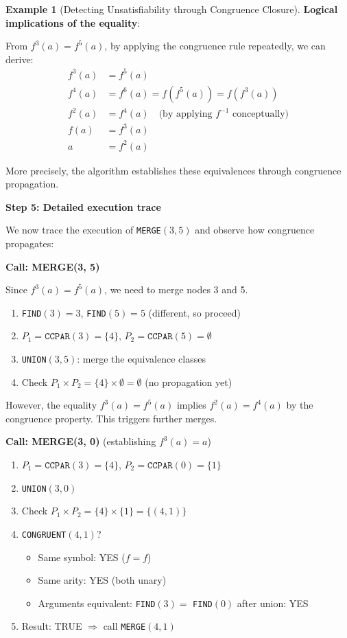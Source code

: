 \documentclass[11pt,a4paper]{article}
\theoremstyle{definition}
\newtheorem{example}{Example}[section]
\theoremstyle{plain}
\theoremstyle{remark}
\begin{document}
\begin{example}[Detecting Unsatisfiability through Congruence Closure]
\textbf{Logical implications of the equality}:

From $f^3(a) = f^5(a)$, by applying the congruence rule repeatedly, we can derive:
\begin{align*}
f^3(a) &= f^5(a) \\
f^4(a) &= f^6(a) = f(f^5(a)) = f(f^3(a)) \\
f^2(a) &= f^4(a) \quad \text{(by applying $f^{-1}$ conceptually)} \\
f(a) &= f^3(a) \\
a &= f^2(a)
\end{align*}

More precisely, the algorithm establishes these equivalences through congruence propagation.

\textbf{Step 5: Detailed execution trace}

We now trace the execution of \texttt{MERGE}$(3, 5)$ and observe how congruence propagates:

\begin{tcolorbox}[colback=green!5!white,colframe=green!75!black,title=\textbf{Execution Trace}]
\textbf{Call: MERGE(3, 5)}

Since $f^3(a) = f^5(a)$, we need to merge nodes 3 and 5.

\begin{enumerate}
    \item \texttt{FIND}$(3) = 3$, \texttt{FIND}$(5) = 5$ (different, so proceed)
    \item $P_1 = \texttt{CCPAR}(3) = \{4\}$, $P_2 = \texttt{CCPAR}(5) = \emptyset$
    \item \texttt{UNION}$(3, 5)$: merge the equivalence classes
    \item Check $P_1 \times P_2 = \{4\} \times \emptyset = \emptyset$ (no propagation yet)
\end{enumerate}

However, the equality $f^3(a) = f^5(a)$ implies $f^2(a) = f^4(a)$ by the congruence property. This triggers further merges.

\textbf{Call: MERGE(3, 0)} (establishing $f^3(a) = a$)

\begin{enumerate}
    \item $P_1 = \texttt{CCPAR}(3) = \{4\}$, $P_2 = \texttt{CCPAR}(0) = \{1\}$
    \item \texttt{UNION}$(3, 0)$
    \item Check $P_1 \times P_2 = \{4\} \times \{1\} = \{(4, 1)\}$
    \item \texttt{CONGRUENT}$(4, 1)$? 
    \begin{itemize}
        \item Same symbol: YES ($f = f$)
        \item Same arity: YES (both unary)
        \item Arguments equivalent: \texttt{FIND}$(3) = $ \texttt{FIND}$(0)$ after union: YES
    \end{itemize}
    \item Result: TRUE $\Rightarrow$ call \texttt{MERGE}$(4, 1)$
\end{enumerate}


\end{tcolorbox}
\end{example}
\end{document}
